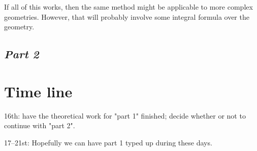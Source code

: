 \documentclass[11pt,a4paper, 
english, swedish %
]{article}
\begin{document}
If all of this works, then the same method might be applicable to more complex geometries. However, that will probably involve some integral formula over the geometry.



\subsection{\textit{Part 2}}





\section{Time line}


16th: have the theoretical work for "part 1" finished; decide whether or not to continue with "part 2".

17--21st: Hopefully we can have part 1 typed up during these days.











%

\end{document}
